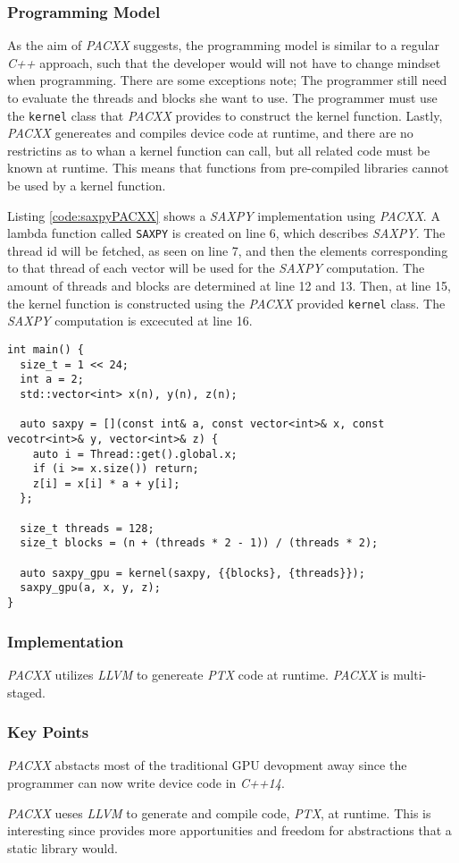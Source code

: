 \subsubsection{Programming Model}
As the aim of \textit{PACXX} suggests, the programming model is similar to a regular \textit{C++} approach, such that the developer would will not have to change mindset when programming. There are some exceptions note; The programmer still need to evaluate the threads and blocks she want to use. The programmer must use the \texttt{kernel} class that \textit{PACXX} provides to construct the kernel function. Lastly, \textit{PACXX} genereates and compiles device code at runtime, and there are no restrictins as to whan a kernel function can call, but all related code must be known at runtime. This means that functions from pre-compiled libraries cannot be used by a kernel function.

Listing \ref{code:saxpyPACXX} shows a \textit{SAXPY} implementation using \textit{PACXX}. A lambda function called \texttt{SAXPY} is created on line 6, which describes \textit{SAXPY}. The thread id will be fetched, as seen on line 7, and then the elements corresponding to that thread of each vector will be used for the \textit{SAXPY} computation. The amount of threads and blocks are determined at line 12 and 13. Then, at line 15, the kernel function is constructed using the \textit{PACXX} provided \texttt{kernel} class. The \textit{SAXPY} computation is excecuted at line 16.

\begin{lstlisting}[caption={\textit{SAXPY} implementation made with \textit{PACXX}.}, label={code:saxpyPACXX}]
int main() {
  size_t = 1 << 24;
  int a = 2;
  std::vector<int> x(n), y(n), z(n);

  auto saxpy = [](const int& a, const vector<int>& x, const vecotr<int>& y, vector<int>& z) {
    auto i = Thread::get().global.x;
    if (i >= x.size()) return;
    z[i] = x[i] * a + y[i];
  };

  size_t threads = 128;
  size_t blocks = (n + (threads * 2 - 1)) / (threads * 2);

  auto saxpy_gpu = kernel(saxpy, {{blocks}, {threads}});
  saxpy_gpu(a, x, y, z);
}
\end{lstlisting}

\subsubsection{Implementation}
\textit{PACXX} utilizes \textit{LLVM} to genereate \textit{PTX} code at runtime. \textit{PACXX} is multi-staged.

\subsubsection{Key Points}
\textit{PACXX} abstacts most of the traditional GPU devopment away since the programmer can now write device code in \textit{C++14}.

\textit{PACXX} ueses \textit{LLVM} to generate and compile code, \textit{PTX}, at runtime. This is interesting since provides more apportunities and freedom for abstractions that a static library would.
